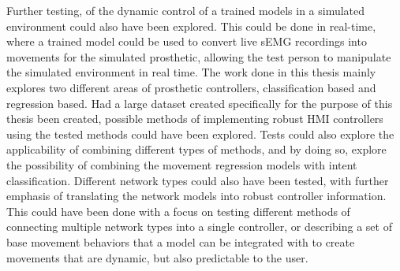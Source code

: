 \documentclass[../main.tex]{subfiles}
\begin{document}
Further testing, of the dynamic control of a trained models in a simulated environment could also have been explored.
This could be done in real-time, where a trained model could be used to convert live \gls{sEMG} recordings into movements for the simulated prosthetic, allowing the test person to manipulate the simulated environment in real time.
The work done in this thesis mainly explores two different areas of prosthetic controllers, classification based and regression based.
Had a large dataset created specifically for the purpose of this thesis been created, possible methods of implementing robust \gls{HMI} controllers using the tested methods could have been explored.
Tests could also explore the applicability of combining different types of methods, and by doing so, explore the possibility of combining the movement regression models with intent classification.  
Different network types could also have been tested, with further emphasis of translating the network models into robust controller information.
This could have been done with a focus on testing different methods of connecting multiple network types into a single controller, or describing a set of base movement behaviors that a model can be integrated with to create movements that are dynamic, but also predictable to the user.  

\end{document}
